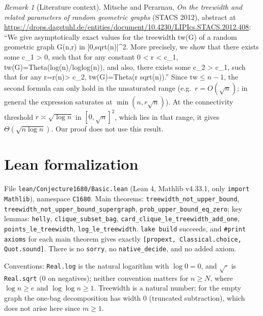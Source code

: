 \documentclass[11pt]{article}
\theoremstyle{definition}
\theoremstyle{remark}
\newtheorem{remark}[theorem]{Remark}
\begin{document}
\begin{remark}[Literature context]
Mitsche and Perarnau, \emph{On the treewidth and related parameters of random geometric graphs}
(STACS 2012), abstract at
\url{https://drops.dagstuhl.de/entities/document/10.4230/LIPIcs.STACS.2012.408}: ``We give
asymptotically exact values for the treewidth tw(G) of a random geometric graph G(n,r) in
[0,sqrt(n)]\^{}2. More precisely, we show that there exists some c\_1 > 0, such that for any
constant 0 < r < c\_1, tw(G)=Theta(log(n)/loglog(n)), and also, there exists some c\_2 > c\_1,
such that for any r=r(n)> c\_2, tw(G)=Theta(r sqrt(n)).'' Since $\mathrm{tw}\le n-1$, the
second formula can only hold in the unsaturated range (e.g.\ $r=O(\sqrt n)$; in general the
expression saturates at $\min(n, r\sqrt n)$). At the connectivity threshold
$r\asymp\sqrt{\log n}$ in $[0,\sqrt n]^2$, which lies in that range, it gives
$\Theta(\sqrt{n\log n})$. Our proof does not use this result.
\end{remark}

\section{Lean formalization}

File \texttt{lean/Conjecture1680/Basic.lean} (Lean 4, Mathlib v4.33.1, only \texttt{import
Mathlib}), namespace \texttt{C1680}. Main theorems: \texttt{treewidth\_not\_upper\_bound},
\texttt{treewidth\_not\_upper\_bound\_supergraph}, \texttt{prob\_upper\_bound\_eq\_zero}; key
lemmas: \texttt{helly}, \texttt{clique\_subset\_bag},
\texttt{card\_clique\_le\_treewidth\_add\_one}, \texttt{points\_le\_treewidth},
\texttt{log\_le\_treewidth}. \texttt{lake build} succeeds, and \texttt{\#print axioms} for each
main theorem gives exactly \texttt{[propext, Classical.choice, Quot.sound]}. There is no
\texttt{sorry}, no \texttt{native\_decide}, and no added axiom.

Conventions: \texttt{Real.log} is the natural logarithm with $\log 0=0$, and $\sqrt{\cdot}$ is
\texttt{Real.sqrt} (0 on negatives); neither convention matters for $n\ge N$, where $\log n\ge e$
and $\log\log n\ge1$. Treewidth is a natural number; for the empty graph the one-bag
decomposition has width $0$ (truncated subtraction), which does not arise here since $m\ge1$.
\end{document}
